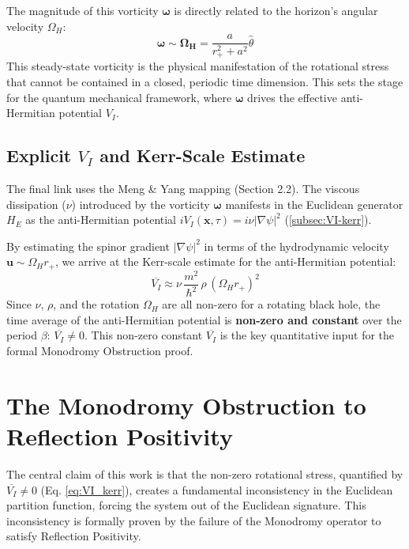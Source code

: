 \documentclass[11pt]{article}
\begin{document}
The magnitude of this vorticity $\mathbf{\omega}$ is directly related to the horizon's angular velocity $\Omega_H$:
\begin{equation}\label{eq:omega_scaling}
    \mathbf{\omega} \sim \mathbf{\Omega_H} = \frac{a}{r_+^2 + a^2} \hat{\theta}
\end{equation}
This steady-state vorticity is the physical manifestation of the rotational stress that cannot be contained in a closed, periodic time dimension. This sets the stage for the quantum mechanical framework, where $\mathbf{\omega}$ drives the effective anti-Hermitian potential $V_I$.

\subsection{Explicit $V_I$ and Kerr-Scale Estimate}
\label{subsec:VI-kerr}

The final link uses the Meng \& Yang mapping (Section 2.2). The viscous dissipation ($\nu$) introduced by the vorticity $\mathbf{\omega}$ manifests in the Euclidean generator $H_E$ as the anti-Hermitian potential $iV_I(\mathbf{x}, \tau) = i\nu|\nabla\psi|^2$ (\autoref{subsec:VI-kerr}).

By estimating the spinor gradient $|\nabla\psi|^2$ in terms of the hydrodynamic velocity $\mathbf{u} \sim \Omega_H r_+$, we arrive at the Kerr-scale estimate for the anti-Hermitian potential:
\begin{equation}\label{eq:VI_kerr}
    \overline{V_I} \approx \nu\,\frac{m^2}{\hbar^2}\,\rho\,(\Omega_H r_+)^2
\end{equation}
Since $\nu$, $\rho$, and the rotation $\Omega_H$ are all non-zero for a rotating black hole, the time average of the anti-Hermitian potential is \textbf{non-zero and constant} over the period $\beta$: $\overline{V_I} \neq 0$. This non-zero constant $\overline{V_I}$ is the key quantitative input for the formal Monodromy Obstruction proof.

\section{The Monodromy Obstruction to Reflection Positivity}

The central claim of this work is that the non-zero rotational stress, quantified by $\overline{V_I} \neq 0$ (Eq. \ref{eq:VI_kerr}), creates a fundamental inconsistency in the Euclidean partition function, forcing the system out of the Euclidean signature. This inconsistency is formally proven by the failure of the Monodromy operator to satisfy Reflection Positivity\cite{OsterwalderSchrader1973}.
\end{document}
